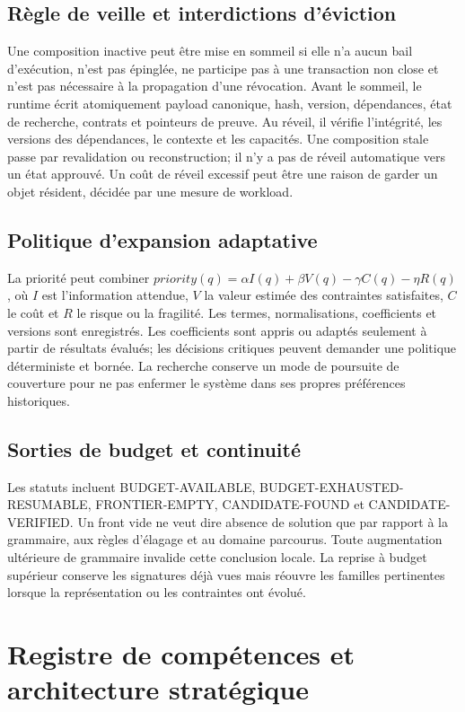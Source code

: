 \documentclass[11pt,a4paper]{article}
\newcommand{\State}[1]{\textsf{#1}}
\begin{document}
\subsection{Règle de veille et interdictions d'éviction}
Une composition inactive peut être mise en sommeil si elle n'a aucun bail d'exécution, n'est pas épinglée, ne participe pas à une transaction non close et n'est pas nécessaire à la propagation d'une révocation. Avant le sommeil, le runtime écrit atomiquement payload canonique, hash, version, dépendances, état de recherche, contrats et pointeurs de preuve. Au réveil, il vérifie l'intégrité, les versions des dépendances, le contexte et les capacités. Une composition stale passe par revalidation ou reconstruction; il n'y a pas de réveil automatique vers un état approuvé. Un coût de réveil excessif peut être une raison de garder un objet résident, décidée par une mesure de workload.

\subsection{Politique d'expansion adaptative}
La priorité peut combiner \(priority(q)=\alpha I(q)+\beta V(q)-\gamma C(q)-\eta R(q)\), où \(I\) est l'information attendue, \(V\) la valeur estimée des contraintes satisfaites, \(C\) le coût et \(R\) le risque ou la fragilité. Les termes, normalisations, coefficients et versions sont enregistrés. Les coefficients sont appris ou adaptés seulement à partir de résultats évalués; les décisions critiques peuvent demander une politique déterministe et bornée. La recherche conserve un mode de poursuite de couverture pour ne pas enfermer le système dans ses propres préférences historiques.

\subsection{Sorties de budget et continuité}
Les statuts incluent \State{BUDGET-AVAILABLE}, \State{BUDGET-EXHAUSTED-RESUMABLE}, \State{FRONTIER-EMPTY}, \State{CANDIDATE-FOUND} et \State{CANDIDATE-VERIFIED}. Un front vide ne veut dire absence de solution que par rapport à la grammaire, aux règles d'élagage et au domaine parcourus. Toute augmentation ultérieure de grammaire invalide cette conclusion locale. La reprise à budget supérieur conserve les signatures déjà vues mais réouvre les familles pertinentes lorsque la représentation ou les contraintes ont évolué.

\section{Registre de compétences et architecture stratégique}
\end{document}
